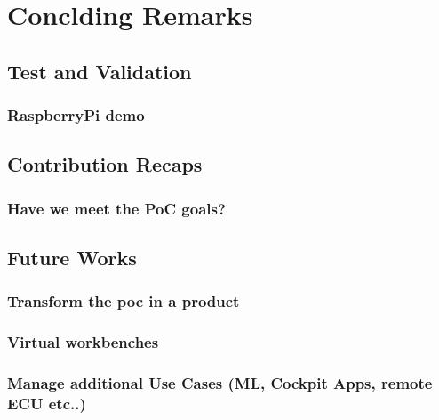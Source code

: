 \chapter{Conclding Remarks} \label{ch:concldingRemarks}
\section{Test and Validation}
\subsection{RaspberryPi demo}

\section{Contribution Recaps}
\subsection{Have we meet the PoC goals?}

\section{Future Works}
\subsection{Transform the poc in a product}
\subsection{Virtual workbenches}
\subsection{Manage additional Use Cases (ML, Cockpit Apps, remote ECU etc..)}